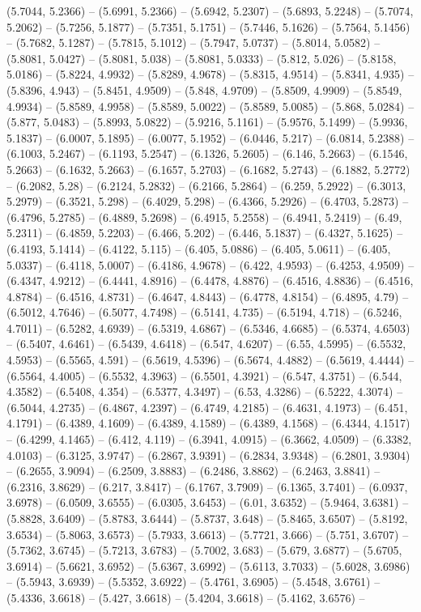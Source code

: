 (5.7044, 5.2366) -- (5.6991, 5.2366) -- (5.6942, 5.2307) -- (5.6893, 5.2248) -- (5.7074, 5.2062) -- (5.7256, 5.1877) -- (5.7351, 5.1751) -- (5.7446, 5.1626) -- (5.7564, 5.1456) -- (5.7682, 5.1287) -- (5.7815, 5.1012) -- (5.7947, 5.0737) -- (5.8014, 5.0582) -- (5.8081, 5.0427) -- (5.8081, 5.038) -- (5.8081, 5.0333) -- (5.812, 5.026) -- (5.8158, 5.0186) -- (5.8224, 4.9932) -- (5.8289, 4.9678) -- (5.8315, 4.9514) -- (5.8341, 4.935) -- (5.8396, 4.943) -- (5.8451, 4.9509) -- (5.848, 4.9709) -- (5.8509, 4.9909) -- (5.8549, 4.9934) -- (5.8589, 4.9958) -- (5.8589, 5.0022) -- (5.8589, 5.0085) -- (5.868, 5.0284) -- (5.877, 5.0483) -- (5.8993, 5.0822) -- (5.9216, 5.1161) -- (5.9576, 5.1499) -- (5.9936, 5.1837) -- (6.0007, 5.1895) -- (6.0077, 5.1952) -- (6.0446, 5.217) -- (6.0814, 5.2388) -- (6.1003, 5.2467) -- (6.1193, 5.2547) -- (6.1326, 5.2605) -- (6.146, 5.2663) -- (6.1546, 5.2663) -- (6.1632, 5.2663) -- (6.1657, 5.2703) -- (6.1682, 5.2743) -- (6.1882, 5.2772) -- (6.2082, 5.28) -- (6.2124, 5.2832) -- (6.2166, 5.2864) -- (6.259, 5.2922) -- (6.3013, 5.2979) -- (6.3521, 5.298) -- (6.4029, 5.298) -- (6.4366, 5.2926) -- (6.4703, 5.2873) -- (6.4796, 5.2785) -- (6.4889, 5.2698) -- (6.4915, 5.2558) -- (6.4941, 5.2419) -- (6.49, 5.2311) -- (6.4859, 5.2203) -- (6.466, 5.202) -- (6.446, 5.1837) -- (6.4327, 5.1625) -- (6.4193, 5.1414) -- (6.4122, 5.115) -- (6.405, 5.0886) -- (6.405, 5.0611) -- (6.405, 5.0337) -- (6.4118, 5.0007) -- (6.4186, 4.9678) -- (6.422, 4.9593) -- (6.4253, 4.9509) -- (6.4347, 4.9212) -- (6.4441, 4.8916) -- (6.4478, 4.8876) -- (6.4516, 4.8836) -- (6.4516, 4.8784) -- (6.4516, 4.8731) -- (6.4647, 4.8443) -- (6.4778, 4.8154) -- (6.4895, 4.79) -- (6.5012, 4.7646) -- (6.5077, 4.7498) -- (6.5141, 4.735) -- (6.5194, 4.718) -- (6.5246, 4.7011) -- (6.5282, 4.6939) -- (6.5319, 4.6867) -- (6.5346, 4.6685) -- (6.5374, 4.6503) -- (6.5407, 4.6461) -- (6.5439, 4.6418) -- (6.547, 4.6207) -- (6.55, 4.5995) -- (6.5532, 4.5953) -- (6.5565, 4.591) -- (6.5619, 4.5396) -- (6.5674, 4.4882) -- (6.5619, 4.4444) -- (6.5564, 4.4005) -- (6.5532, 4.3963) -- (6.5501, 4.3921) -- (6.547, 4.3751) -- (6.544, 4.3582) -- (6.5408, 4.354) -- (6.5377, 4.3497) -- (6.53, 4.3286) -- (6.5222, 4.3074) -- (6.5044, 4.2735) -- (6.4867, 4.2397) -- (6.4749, 4.2185) -- (6.4631, 4.1973) -- (6.451, 4.1791) -- (6.4389, 4.1609) -- (6.4389, 4.1589) -- (6.4389, 4.1568) -- (6.4344, 4.1517) -- (6.4299, 4.1465) -- (6.412, 4.119) -- (6.3941, 4.0915) -- (6.3662, 4.0509) -- (6.3382, 4.0103) -- (6.3125, 3.9747) -- (6.2867, 3.9391) -- (6.2834, 3.9348) -- (6.2801, 3.9304) -- (6.2655, 3.9094) -- (6.2509, 3.8883) -- (6.2486, 3.8862) -- (6.2463, 3.8841) -- (6.2316, 3.8629) -- (6.217, 3.8417) -- (6.1767, 3.7909) -- (6.1365, 3.7401) -- (6.0937, 3.6978) -- (6.0509, 3.6555) -- (6.0305, 3.6453) -- (6.01, 3.6352) -- (5.9464, 3.6381) -- (5.8828, 3.6409) -- (5.8783, 3.6444) -- (5.8737, 3.648) -- (5.8465, 3.6507) -- (5.8192, 3.6534) -- (5.8063, 3.6573) -- (5.7933, 3.6613) -- (5.7721, 3.666) -- (5.751, 3.6707) -- (5.7362, 3.6745) -- (5.7213, 3.6783) -- (5.7002, 3.683) -- (5.679, 3.6877) -- (5.6705, 3.6914) -- (5.6621, 3.6952) -- (5.6367, 3.6992) -- (5.6113, 3.7033) -- (5.6028, 3.6986) -- (5.5943, 3.6939) -- (5.5352, 3.6922) -- (5.4761, 3.6905) -- (5.4548, 3.6761) -- (5.4336, 3.6618) -- (5.427, 3.6618) -- (5.4204, 3.6618) -- (5.4162, 3.6576) -- 